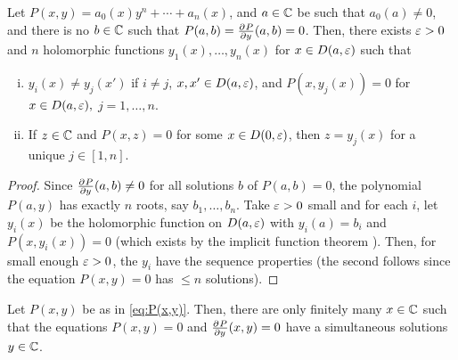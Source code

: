 \documentclass[11pt]{article}
\begin{document}
\begin{lem}
    Let $P(x,y) = a_0(x)y^n+\cdots + a_n(x)$, and $a \in \mathbb{C}$ be such that $a_0(a) \neq 0$, and there is no $b \in \mathbb{C}$ such that $P(a,b) = \frac{\partial^{}P}{\partial y^{}}(a,b)=0$. Then, there exists $\varepsilon >0$ and $n$ holomorphic functions $y_1(x),\dots,y_n(x)$ for $x \in D(a,\varepsilon)$ such that
    \begin{enumerate}[(i)]
        \item $y_i(x) \neq y_j(x')$ if $i \neq j$, $x,x' \in D(a,\varepsilon)$, and $P(x,y_j(x))=0$ for $x \in D(a,\varepsilon),$ $j=1,\dots,n$.
        \item If $z \in \mathbb{C}$ and $P(x,z)=0$ for some $x \in D(0,\varepsilon)$, then $z = y_j(x)$ for a unique $j \in [1,n]$.
    \end{enumerate}
\end{lem}

\begin{proof}
    Since $\frac{\partial^{}P}{\partial y^{}}(a,b) \neq 0$ for all solutions $b$ of $P(a,b)=0$, the polynomial $P(a,y)$ has exactly $n$ roots, say $b_1,\dots,b_n$. Take $\varepsilon>0$ small and for each $i$, let $y_i(x)$ be the holomorphic function on $D(a,\varepsilon)$ with $y_i(a) = b_i$ and $P(x,y_i(x))=0$ (which exists by the implicit function theorem ). Then, for small enough $\varepsilon>0$, the $y_i$ have the sequence properties (the second follows since the equation $P(x,y)=0$ has $\leq n$ solutions).
\end{proof}

\begin{prop}[][label=prop:simsolutions]
    Let $P(x,y)$ be as in \eqref{eq:P(x,y)}. Then, there are only finitely many $x \in \mathbb{C}$ such that the equations $P(x,y)=0$ and $\frac{\partial^{}P}{\partial y^{}}(x,y)=0$ have a simultaneous solutions $y\in \mathbb{C}$.
\end{prop}
\end{document}
